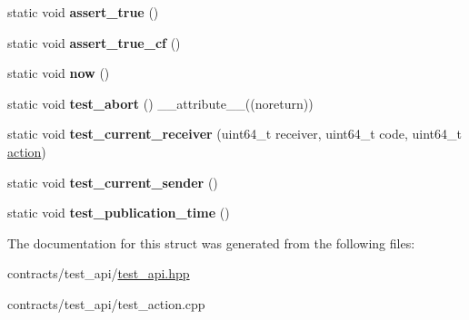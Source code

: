 \begin{DoxyCompactItemize}
\mbox{\label{structtest__action_abcec8fa2b81fba66f00f12cc22a27f25}} 
static void {\bfseries assert\+\_\+true} ()
\item 
\mbox{\label{structtest__action_a51d13f55662c00cd2feeff1d7106a93f}} 
static void {\bfseries assert\+\_\+true\+\_\+cf} ()
\item 
\mbox{\label{structtest__action_a7148f3ebdeb95b702f7c63651bc5cf0d}} 
static void {\bfseries now} ()
\item 
\mbox{\label{structtest__action_ae0dd988eb8b4b9129447ab291b30a1f0}} 
static void {\bfseries test\+\_\+abort} () \+\_\+\+\_\+attribute\+\_\+\+\_\+((noreturn))
\item 
\mbox{\label{structtest__action_af34e811076f815b47c5307441291b17d}} 
static void {\bfseries test\+\_\+current\+\_\+receiver} (uint64\+\_\+t receiver, uint64\+\_\+t code, uint64\+\_\+t \mbox{\hyperlink{structaction}{action}})
\item 
\mbox{\label{structtest__action_a347039f343b553839adf9a08997f6d23}} 
static void {\bfseries test\+\_\+current\+\_\+sender} ()
\item 
\mbox{\label{structtest__action_a379e7dfc446c022d209d5faa18e1a1f1}} 
static void {\bfseries test\+\_\+publication\+\_\+time} ()
\end{DoxyCompactItemize}


The documentation for this struct was generated from the following files\+:\begin{DoxyCompactItemize}
\item 
contracts/test\+\_\+api/\mbox{\hyperlink{test__api_8hpp}{test\+\_\+api.\+hpp}}\item 
contracts/test\+\_\+api/test\+\_\+action.\+cpp\end{DoxyCompactItemize}
